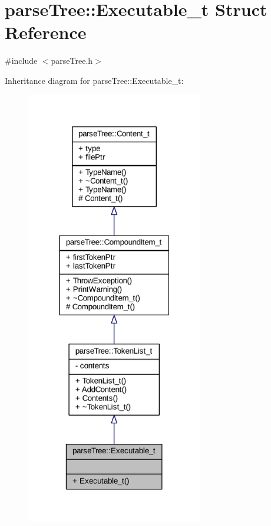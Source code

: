 \hypertarget{structparse_tree_1_1_executable__t}{}\section{parse\+Tree\+:\+:Executable\+\_\+t Struct Reference}
\label{structparse_tree_1_1_executable__t}


{\ttfamily \#include $<$parse\+Tree.\+h$>$}



Inheritance diagram for parse\+Tree\+:\+:Executable\+\_\+t\+:
\nopagebreak
\begin{figure}[H]
\begin{center}
\leavevmode
\includegraphics[width=219pt]{structparse_tree_1_1_executable__t__inherit__graph}
\end{center}
\end{figure}



